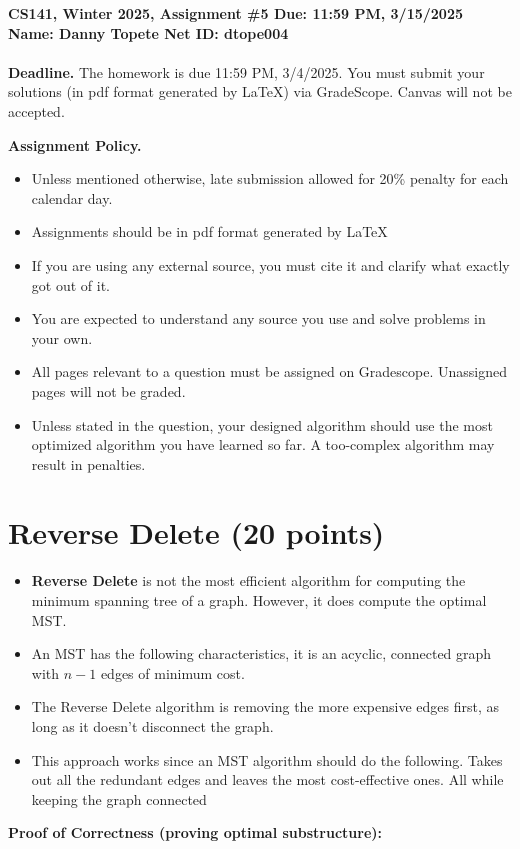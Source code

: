 \documentclass{article}[12pt]
\newcommand{\policy}[1]{#1}
\newcommand{\policy}[1]{}
\newcommand{\deadline}{11:59 PM, 3/15/2025}
\newcommand{\assigntitle}[1]{{
  \noindent \large \bf
  CS141, Winter 2025,
  Assignment \##1 \hfill Due: {\deadline}\\
  Name: Danny Topete %
  \hspace{2.5in}
  Net ID: dtope004 %
  \\
  [-.05in]
  \mbox{}\hrulefill \mbox{}\\}}
\begin{document}
\assigntitle{5}{}
\policy{\textbf{Deadline.} The homework is due 11:59 PM, 3/4/2025. You must submit your solutions (in pdf
format generated by LaTeX) via GradeScope. Canvas will not be accepted.}\\
\date{}
\policy{\textbf{Assignment Policy.}
\begin{itemize}
    \item Unless mentioned otherwise, late submission allowed for 20\% penalty for each calendar day.
    \item Assignments should be in pdf format generated by LaTeX
    \item If you are using any external source, you must cite it and clarify what exactly got out of it.
    \item You are expected to understand any source you use and solve problems in your own.
    \item All pages relevant to a question must be assigned on Gradescope. Unassigned pages will not be graded.
    \item Unless stated in the question, your designed algorithm should use the most optimized algorithm you have learned so far. A too-complex algorithm may result in penalties.
\end{itemize}


}


\section{Reverse Delete (20 points)}
\begin{itemize}
  \item \textbf{Reverse Delete} is not the most efficient algorithm for computing the minimum spanning tree of a graph.
    However, it does compute the optimal MST.
  \item An MST has the following characteristics, it is an acyclic, connected graph with $n-1$ edges
    of minimum cost.
  \item The Reverse Delete algorithm is removing the more expensive edges first, as long as it doesn't disconnect the graph.
  \item This approach works since an MST algorithm should do the following.
    Takes out all the redundant edges and leaves the most cost-effective ones.
    All while keeping the graph connected
\end{itemize}

\textbf{Proof of Correctness (proving optimal substructure):}
\end{document}
